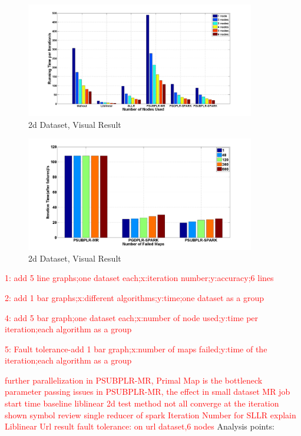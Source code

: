 \documentclass{llncs}
\newcommand{\comment}{\textcolor{red}}
\begin{document}
\begin{figure}[tb] \label{fig:13}
\center \includegraphics[height=5cm,width=10cm]{img/URL-Reputation_time.png}
\caption{2d Dataset, Visual Result}
\end{figure}


\begin{figure}[tb] \label{fig:14}
\center \includegraphics[height=5cm,width=10cm]{img/fault_tolerance.png}
\caption{2d Dataset, Visual Result}
\end{figure}

\comment{1: add 5 line graphs;one dataset each;x:iteration number;y:accuracy;6 lines}

\comment{2: add 1 bar graphs;x:different algorithms;y:time;one dataset as a group}


\comment{4: add 5 bar graph;one dataset each;x:number of node used;y:time per iteration;each algorithm as a group}

\comment{5: Fault tolerance-add 1 bar graph;x:number of maps failed;y:time of the iteration;each algorithm as a group}

\comment{further parallelization in PSUBPLR-MR, Primal Map is the bottleneck}
\comment{parameter passing issues in PSUBPLR-MR, the effect in small dataset}
\comment{MR job start time}
\comment{baseline liblinear}
\comment{2d test method}
\comment{not all converge at the iteration shown}
\comment{symbol review}
\comment{single reducer of spark}
\comment{Iteration Number for SLLR explain}
\comment{Liblinear Url result}
\comment{fault tolerance: on url dataset,6 nodes}
Analysis points:
\end{document}
